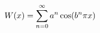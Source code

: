 \documentclass[preview]{standalone}
\begin{document}
\begin{align*}
\special{dvisvgm:raw <g id='unique000'>}W(x) = \sum_{n=0}^{\infty} a^n \cos(b^n \pi x)\special{dvisvgm:raw </g>}
\end{align*}
\end{document}
